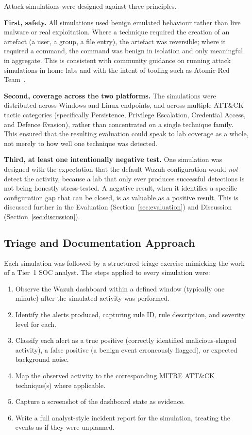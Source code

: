 Attack simulations were designed against three principles.

\textbf{First, safety.} All simulations used benign emulated behaviour rather
than live malware or real exploitation. Where a technique required the
creation of an artefact (a user, a group, a file entry), the artefact was
reversible; where it required a command, the command was benign in isolation
and only meaningful in aggregate. This is consistent with community
guidance on running attack simulations in home labs and with the intent of
tooling such as Atomic Red Team~\cite{atomicredteam}.

\textbf{Second, coverage across the two platforms.} The simulations were
distributed across Windows and Linux endpoints, and across multiple ATT\&CK
tactic categories (specifically Persistence, Privilege Escalation, Credential
Access, and Defence Evasion), rather than concentrated on a single technique
family. This ensured that the resulting evaluation could speak to lab
coverage as a whole, not merely to how well one technique was detected.

\textbf{Third, at least one intentionally negative test.} One simulation was
designed with the expectation that the default Wazuh configuration would
\textit{not} detect the activity, because a lab that only ever produces
successful detections is not being honestly stress-tested. A negative result,
when it identifies a specific configuration gap that can be closed, is as
valuable as a positive result. This is discussed further in the Evaluation
(Section~\ref{sec:evaluation}) and Discussion (Section~\ref{sec:discussion}).

\subsection{Triage and Documentation Approach}
\label{sec:triage-approach}

Each simulation was followed by a structured triage exercise mimicking the
work of a Tier~1 SOC analyst. The steps applied to every simulation were:

\begin{enumerate}[label=\textbf{T\arabic*.},leftmargin=*]
    \item Observe the Wazuh dashboard within a defined window (typically one
          minute) after the simulated activity was performed.
    \item Identify the alerts produced, capturing rule ID, rule description,
          and severity level for each.
    \item Classify each alert as a true positive (correctly identified
          malicious-shaped activity), a false positive (a benign event
          erroneously flagged), or expected background noise.
    \item Map the observed activity to the corresponding MITRE ATT\&CK
          technique(s) where applicable.
    \item Capture a screenshot of the dashboard state as evidence.
    \item Write a full analyst-style incident report for the simulation,
          treating the events as if they were unplanned.
\end{enumerate}

